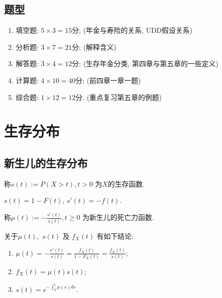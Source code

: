 \documentclass[lang=cn,10pt]{elegantbook}
\begin{document}
\section*{题型}
\begin{enumerate}
	\item 填空题: $5\times 3 = 15$分; (年金与寿险的关系, UDD假设关系)
	\item 分析题: $3\times 7 = 21$分; (解释含义)
	\item 解答题: $3\times 4 = 12$分; (生存年金分类, 第四章与第五章的一些定义)
	\item 计算题: $4\times 10 = 40$分; (前四章一章一题)
	\item 综合题: $1\times 12 = 12$分. (重点复习第五章的例题)
\end{enumerate}

\chapter{生存分布}

\section{新生儿的生存分布}

\begin{definition}[生存函数]
  称$s(t):=P(X>t),t>0$ 为$X$的生存函数.
\end{definition}

\begin{corollary}
  $s(t)=1-F(t)$, $s'(t)=-f(t)$.
\end{corollary}

\begin{definition}[死亡力函数]
  称$\mu(t):=-\frac{s'(t)}{s(t)},t\ge 0$ 为新生儿的死亡力函数.
\end{definition}

\begin{corollary} 关于$\mu(t),$ $s(t)$ 及 $f_X(t)$ 有如下结论:
\begin{enumerate}
	\item $\mu(t)=-\frac{s'(t)}{s(t)}=\frac{f_X(t)}{1-F_X(t)}=\frac{f_X(t)}{s(t)};$
	\item $f_X(t)=\mu(t)s(t);$
	\item $s(t)=e^{-\int_0^t\mu(s)ds}.$
\end{enumerate}
\end{corollary}
\end{document}
